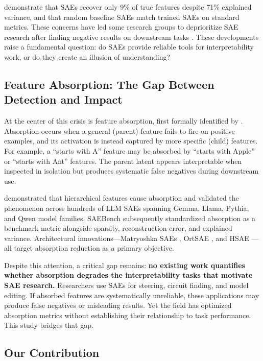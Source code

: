 \documentclass{article}
\begin{document}
\citet{korznikov2026ort} demonstrate that SAEs recover only 9\% of true features despite 71\% explained variance, and that random baseline SAEs match trained SAEs on standard metrics. These concerns have led some research groups to deprioritize SAE research after finding negative results on downstream tasks \citep{bricken2023monosemanticity, lieberum2023sae}. These developments raise a fundamental question: do SAEs provide reliable tools for interpretability work, or do they create an illusion of understanding?

\subsection{Feature Absorption: The Gap Between Detection and Impact}
\label{sec:absorption}

At the center of this crisis is feature absorption, first formally identified by \citet{chanin2024causal}. Absorption occurs when a general (parent) feature fails to fire on positive examples, and its activation is instead captured by more specific (child) features. For example, a ``starts with A'' feature may be absorbed by ``starts with Apple'' or ``starts with Ant'' features. The parent latent appears interpretable when inspected in isolation but produces systematic false negatives during downstream use.

\citet{chanin2024causal} demonstrated that hierarchical features cause absorption and validated the phenomenon across hundreds of LLM SAEs spanning Gemma, Llama, Pythia, and Qwen model families. SAEBench \citep{karvonen2025saebench} subsequently standardized absorption as a benchmark metric alongside sparsity, reconstruction error, and explained variance. Architectural innovations---Matryoshka SAEs \citep{bussmann2025matryoshka}, OrtSAE \citep{korznikov2026ort}, and HSAE \citep{luo2026hsae}---all target absorption reduction as a primary objective.

Despite this attention, a critical gap remains: \textbf{no existing work quantifies whether absorption degrades the interpretability tasks that motivate SAE research.} Researchers use SAEs for steering, circuit finding, and model editing. If absorbed features are systematically unreliable, these applications may produce false negatives or misleading results. Yet the field has optimized absorption metrics without establishing their relationship to task performance. This study bridges that gap.

\subsection{Our Contribution}
\label{sec:contribution}
\end{document}

